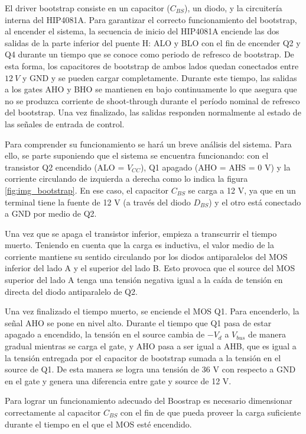 \noindent El driver bootstrap consiste en un capacitor ($C_{BS}$), un diodo, y la circuitería interna del HIP4081A. Para garantizar el correcto funcionamiento del bootstrap, al encender el sistema, la secuencia de inicio del HIP4081A enciende las dos salidas de la parte inferior del puente H: ALO y BLO con el fin de encender Q2 y Q4 durante un tiempo que se conoce como periodo de refresco de bootstrap. De esta forma, los capacitores de bootstrap de ambos lados quedan conectados entre $12 \:V$ y GND y se pueden cargar completamente. Durante este tiempo, las salidas a los gates AHO y BHO se mantienen en bajo continuamente lo que asegura que no se produzca corriente de shoot-through durante el período nominal de refresco del bootstrap. Una vez finalizado, las salidas responden normalmente al estado de las señales de entrada de control.

\noindent Para comprender su funcionamiento se hará un breve análisis del sistema. Para ello, se parte suponiendo que el sistema se encuentra funcionando: con el transistor Q2 encendido (ALO = $V_{CC}$), Q1 apagado (AHO = AHS = 0 V) y la corriente circulando de izquierda a derecha como lo indica la figura \ref{fig:img_bootstrap}. En ese caso, el capacitor $C_{BS}$ se carga a 12 V, ya que en un terminal tiene la fuente de 12 V (a través del diodo $D_{BS}$) y el otro está conectado a GND por medio de Q2.

\noindent Una vez que se apaga el transistor inferior, empieza a transcurrir el tiempo muerto. Teniendo en cuenta que la carga es inductiva, el valor medio de la corriente mantiene su sentido circulando por los diodos antiparalelos del MOS inferior del lado A y el superior del lado B. Esto provoca que el source del MOS superior del lado A tenga una tensión negativa igual a la caída de tensión en directa del diodo antiparalelo de Q2. 

\noindent Una vez finalizado el tiempo muerto, se enciende el MOS Q1. Para encenderlo, la señal AHO se pone en nivel alto. Durante el tiempo que Q1 pasa de estar apagado a encendido, la tensión en el source cambia de $-V_d$ a $V_{bus}$ de manera gradual mientras se carga el gate, y AHO pasa a ser igual a AHB, que es igual a la tensión entregada por el capacitor de bootstrap sumada a la tensión en el source de Q1. De esta manera se logra una tensión de 36 V con respecto a GND en el gate y genera una diferencia entre gate y source de 12 V.

\noindent Para lograr un funcionamiento adecuado del Boostrap es necesario dimensionar correctamente al capacitor $C_{BS}$ con el fin de que pueda proveer la carga suficiente durante el tiempo en el que el MOS esté encendido.


